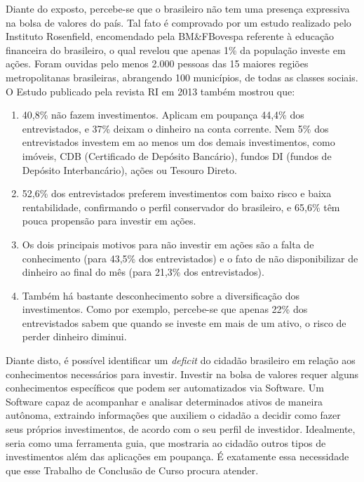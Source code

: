 Diante do exposto, percebe-se que o brasileiro não tem uma presença expressiva na bolsa de valores do país. Tal fato é comprovado por um estudo realizado pelo Instituto Rosenfield, encomendado pela BM\&FBovespa referente à educação financeira do brasileiro, o qual revelou que apenas 1\% da população investe em ações. Foram ouvidas pelo menos 2.000 pessoas das 15 maiores regiões metropolitanas brasileiras, abrangendo 100 municípios, de todas as classes sociais\cite{isabella2013}. O Estudo  publicado pela revista RI em 2013 também mostrou que:

\begin{citacao}
\begin{enumerate}
\item 40,8\% não fazem investimentos. Aplicam em poupança 44,4\% dos entrevistados, e 37\% deixam o dinheiro na conta corrente. Nem 5\% dos entrevistados investem em ao menos um dos demais investimentos, como imóveis, CDB (Certificado de Depósito Bancário), fundos DI (fundos de Depósito Interbancário), ações ou Tesouro Direto.
\item 52,6\% 	dos entrevistados preferem investimentos com baixo risco e baixa rentabilidade, confirmando o perfil conservador do brasileiro, e 65,6\% têm pouca propensão para investir em ações.
\item Os dois principais motivos para não investir em ações são a falta de conhecimento (para 43,5\% dos entrevistados) e o fato de não disponibilizar de dinheiro ao final do mês (para 21,3\% dos entrevistados).
\item Também há bastante desconhecimento sobre a diversificação dos investimentos. Como por exemplo, percebe-se que apenas 22\% dos entrevistados sabem que quando se investe em mais de um ativo, o risco de perder dinheiro diminui.\cite{isabella2013}

\end{enumerate}
\end{citacao}

Diante disto, é possível identificar um \textit{deficit} do cidadão brasileiro em relação aos conhecimentos necessários para investir. Investir na bolsa de valores requer alguns conhecimentos específicos que podem ser automatizados via Software. Um Software capaz de acompanhar e analisar determinados ativos de maneira autônoma, extraindo informações que auxiliem o cidadão a decidir como fazer seus próprios investimentos, de acordo com o seu perfil de investidor. Idealmente, seria como uma ferramenta guia, que mostraria ao cidadão outros tipos de investimentos além das aplicações em poupança. É exatamente essa necessidade que esse Trabalho de Conclusão de Curso procura atender.

